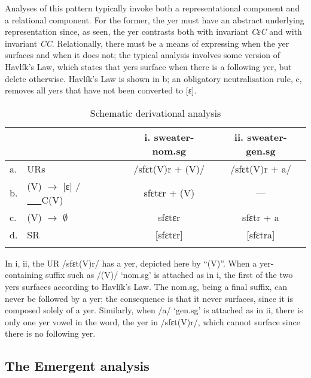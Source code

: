 Analyses of this pattern typically invoke both a representational component and a relational component. For the former, the yer must have an abstract underlying representation since, as seen, the yer contrasts both with invariant {\it CɛC} and with invariant {\it CC}. Relationally, there must be a means of expressing when the yer surfaces and when it does not; the typical analysis involves some version of Havlík's Law,  which states that  yers   surface when there is a following yer, but delete otherwise.  Havlík's Law is shown in b; an obligatory neutralisation rule, c, removes all yers  that have not been converted to [ɛ]. 


 
\begin{table} 
\caption{Schematic derivational analysis\label{Polish_schematic_rules}}
\begin{tabular}{l l cc}
\lsptoprule
	&		&i. {\sc sweater-nom.sg}&ii. {\sc sweater-gen.sg}\\\midrule
a.	&URs	&/sfɛt(V)r + (V)/ &/sfɛt(V)r + a/\\
b.	&(V) $\rightarrow$ [ɛ] / \uline{~~~}C\down{$\emptyset$}(V)	&sfɛtɛr + (V)&---\\
c.	&(V) $\rightarrow$ $\emptyset$	&sfɛtɛr&sfɛtr + a \\
d.	&SR				&[sfɛtɛr]	&[sfɛtra]\\
\lspbottomrule
\end{tabular}
\end{table}

In i, ii, the UR /sfɛt(V)r/  has a yer, depicted here by ``(V)''. When a yer-containing suffix such as /(V)/ `{\sc nom.sg}' is attached as in i, the first of the two  yers  surfaces according to Havlík's Law. The {\sc nom.sg}, being a final suffix, can never be followed by a yer; the consequence is that it never surfaces, since it is composed solely of a yer. Similarly, when /a/ `{\sc gen.sg}' is attached as in ii, there is only one yer vowel in the word, the yer in /sfɛt(V)r/, which cannot surface since there is no following yer.

\subsection{The Emergent analysis}

